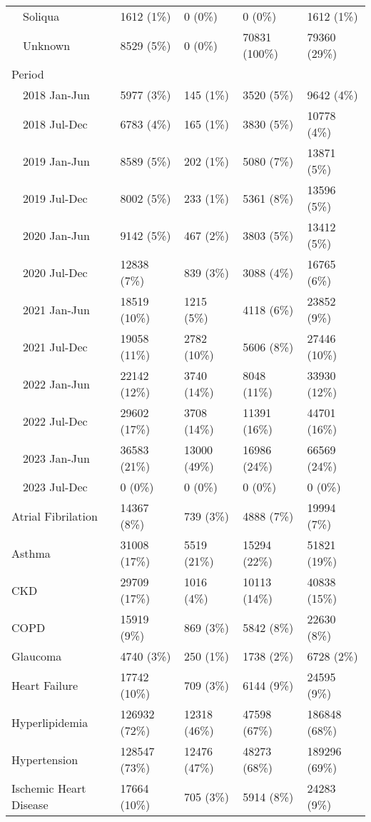 \begin{longtable}{p{}p{}p{}p{}p{}}
    Soliqua & 1612 (1\%) & 0 (0\%) & 0 (0\%) & 1612 (1\%) \\ 
    Unknown & 8529 (5\%) & 0 (0\%) & 70831 (100\%) & 79360 (29\%) \\ 
  Period &  &  &  &  \\ 
    2018 Jan-Jun & 5977 (3\%) & 145 (1\%) & 3520 (5\%) & 9642 (4\%) \\ 
    2018 Jul-Dec & 6783 (4\%) & 165 (1\%) & 3830 (5\%) & 10778 (4\%) \\ 
    2019 Jan-Jun & 8589 (5\%) & 202 (1\%) & 5080 (7\%) & 13871 (5\%) \\ 
    2019 Jul-Dec & 8002 (5\%) & 233 (1\%) & 5361 (8\%) & 13596 (5\%) \\ 
    2020 Jan-Jun & 9142 (5\%) & 467 (2\%) & 3803 (5\%) & 13412 (5\%) \\ 
    2020 Jul-Dec & 12838 (7\%) & 839 (3\%) & 3088 (4\%) & 16765 (6\%) \\ 
    2021 Jan-Jun & 18519 (10\%) & 1215 (5\%) & 4118 (6\%) & 23852 (9\%) \\ 
    2021 Jul-Dec & 19058 (11\%) & 2782 (10\%) & 5606 (8\%) & 27446 (10\%) \\ 
    2022 Jan-Jun & 22142 (12\%) & 3740 (14\%) & 8048 (11\%) & 33930 (12\%) \\ 
    2022 Jul-Dec & 29602 (17\%) & 3708 (14\%) & 11391 (16\%) & 44701 (16\%) \\ 
    2023 Jan-Jun & 36583 (21\%) & 13000 (49\%) & 16986 (24\%) & 66569 (24\%) \\ 
    2023 Jul-Dec & 0 (0\%) & 0 (0\%) & 0 (0\%) & 0 (0\%) \\ 
  Atrial Fibrilation & 14367 (8\%) & 739 (3\%) & 4888 (7\%) & 19994 (7\%) \\ 
  Asthma & 31008 (17\%) & 5519 (21\%) & 15294 (22\%) & 51821 (19\%) \\ 
  CKD & 29709 (17\%) & 1016 (4\%) & 10113 (14\%) & 40838 (15\%) \\ 
  COPD & 15919 (9\%) & 869 (3\%) & 5842 (8\%) & 22630 (8\%) \\ 
  Glaucoma & 4740 (3\%) & 250 (1\%) & 1738 (2\%) & 6728 (2\%) \\ 
  Heart Failure & 17742 (10\%) & 709 (3\%) & 6144 (9\%) & 24595 (9\%) \\ 
  Hyperlipidemia & 126932 (72\%) & 12318 (46\%) & 47598 (67\%) & 186848 (68\%) \\ 
  Hypertension & 128547 (73\%) & 12476 (47\%) & 48273 (68\%) & 189296 (69\%) \\ 
  Ischemic Heart Disease & 17664 (10\%) & 705 (3\%) & 5914 (8\%) & 24283 (9\%) \\ 

\end{longtable}

